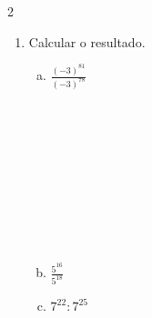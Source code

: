 \documentclass[a4paper,14pt]{article}
\begin{document}
\begin{multicols}{2}
\begin{enumerate}
\begin{enumerate}[a)]
    			\item $\frac{11^{12}}{11^7}$ \\\\\\\\\\\\\\\\\\\\\\
    			\item $\frac{(-3)^4}{(-3)^7}$ \\\\\\\\\\\\\\\\\\\\
    			\item $\frac{x^{21}}{x^{43}}$ \\\\\\\\\\\\\\\\\\\\
    		\end{enumerate}
    		\item Calcular o resultado.
    		\begin{enumerate}[a)]
    			\item $\frac{(-3)^{81}}{(-3)^{78}}$ \\\\\\\\\\\\\\\\\\\\
    			\item $\frac{5^{16}}{5^{18}}$ \newpage
    			\item $7^{22} : 7^{25}$ \\\\\\\\\\\\\\\\\\\\

\end{enumerate}
\end{enumerate}
\end{multicols}
\end{document}
